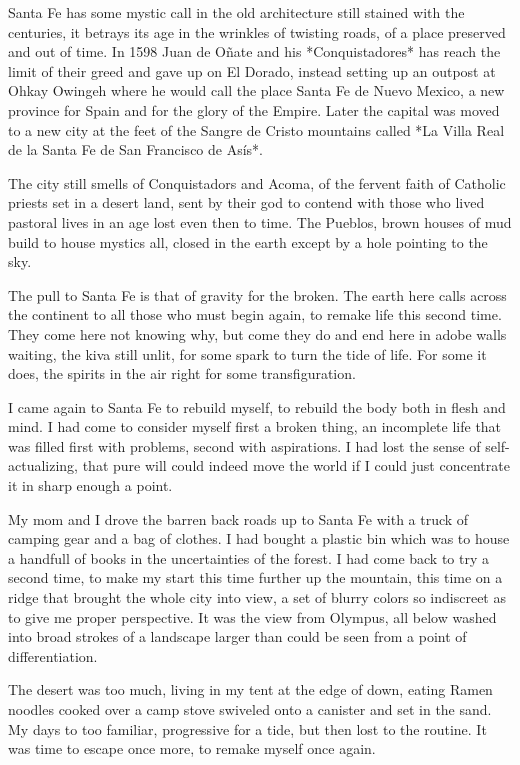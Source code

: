 \documentclass[ebook, 10pt, openright, onecolumn]{memoir}
\begin{document}
Santa Fe has some mystic call in the old architecture still stained with the
centuries, it betrays its age in the wrinkles of twisting roads, of a place
preserved and out of time.  In 1598 Juan de Oñate and his *Conquistadores* has
reach the limit of their greed and gave up on El Dorado, instead setting up an
outpost at Ohkay Owingeh where he would call the place Santa Fe de Nuevo
Mexico, a new province for Spain and for the glory of the Empire.  Later the
capital was moved to a new city at the feet of the Sangre de Cristo mountains
called *La Villa Real de la Santa Fe de San Francisco de Asís*.

The city still smells of Conquistadors and Acoma, of the fervent faith of
Catholic priests set in a desert land, sent by their god to contend with those
who lived pastoral lives in an age lost even then to time.  The Pueblos, brown
houses of mud build to house mystics all, closed in the earth except by a hole
pointing to the sky.

The pull to Santa Fe is that of gravity for the broken.  The earth here calls
across the continent to all those who must begin again, to remake life this
second time.  They come here not knowing why, but come they do and end here in
adobe walls waiting, the kiva still unlit, for some spark to turn the tide of
life.  For some it does, the spirits in the air right for some transfiguration.

I came again to Santa Fe to rebuild myself, to rebuild the body both in flesh
and mind.  I had come to consider myself first a broken thing, an incomplete
life that was filled first with problems, second with aspirations.  I had lost
the sense of self-actualizing, that pure will could indeed move the world if I
could just concentrate it in sharp enough a point.

My mom and I drove the barren back roads up to Santa Fe with a truck of camping
gear and a bag of clothes.  I had bought a plastic bin which was to house a
handfull of books in the uncertainties of the forest.  I had come back to try a
second time, to make my start this time further up the mountain, this time on a
ridge that brought the whole city into view, a set of blurry colors so
indiscreet as to give me proper perspective.  It was the view from Olympus, all
below washed into broad strokes of a landscape larger than could be seen from a
point of differentiation.  

The desert was too much, living in my tent at the edge of down, eating Ramen
noodles cooked over a camp stove swiveled onto a canister and set in the sand.
My days to too familiar, progressive for a tide, but then lost to the routine.
It was time to escape once more, to remake myself once again.
\end{document}
